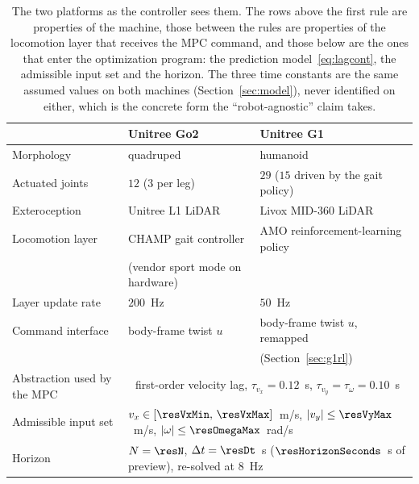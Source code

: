 \documentclass[11pt,a4paper]{article}
\begin{document}
\begin{table}[htbp]
  \centering
  \small
  \caption{The two platforms as the controller sees them. The rows above the first rule are properties of the
  machine, those between the rules are properties of the locomotion layer that receives the MPC command, and
  those below are the ones that enter the optimization program: the prediction model~\eqref{eq:lagcont}, the
  admissible input set and the horizon. The three
  time constants are the same assumed values on both machines (Section~\ref{sec:model}), never identified on
  either, which is the concrete form the ``robot-agnostic'' claim takes.}
  \label{tab:platforms}
  \begin{tabular}{lll}
    \toprule
                                  & Unitree Go2                     & Unitree G1 \\
    \midrule
    Morphology                    & quadruped                       & humanoid \\
    Actuated joints               & $12$ ($3$ per leg)              & $29$ ($15$ driven by the gait policy) \\
    Exteroception                 & Unitree L1 LiDAR                & Livox MID-360 LiDAR \\
    \midrule
    Locomotion layer              & CHAMP gait controller           & AMO reinforcement-learning policy \\
                                  & (vendor sport mode on hardware) & \\
    Layer update rate             & $200$~Hz                        & $50$~Hz \\
    Command interface             & body-frame twist $u$            & body-frame twist $u$, remapped \\
                                  &                                 & (Section~\ref{sec:g1rl}) \\
    \midrule
    Abstraction used by the MPC   & \multicolumn{2}{c}{first-order velocity lag, $\tau_{v_x}=0.12$~s, $\tau_{v_y}=\tau_\omega=0.10$~s} \\
    Admissible input set          & \multicolumn{2}{l}{$v_x\in[\resVxMin,\,\resVxMax]$~m/s, $|v_y|\le\resVyMax$~m/s, $|\omega|\le\resOmegaMax$~rad/s} \\
    Horizon                       & \multicolumn{2}{l}{$N=\resN$, $\Delta t=\resDt$~s ($\resHorizonSeconds$~s of preview), re-solved at $8$~Hz} \\
    \bottomrule
  \end{tabular}
\end{table}
\end{document}
